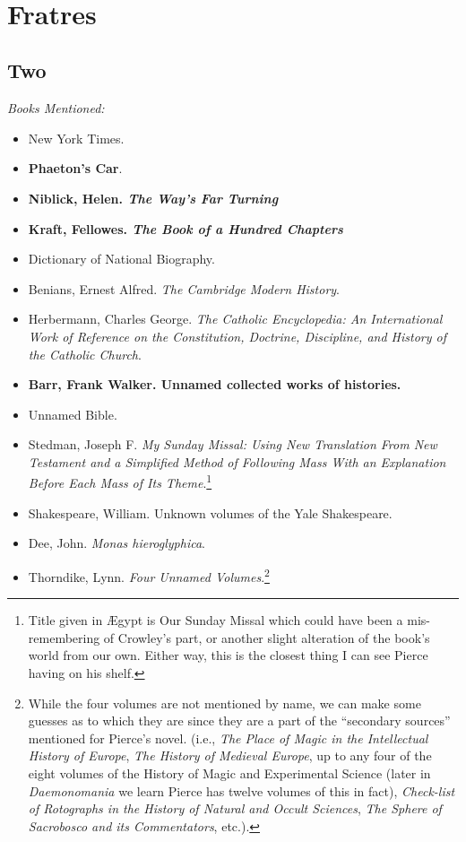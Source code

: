 \documentclass[12pt,makeidx]{extreport}
\newcommand\fleuron{\begin{turn}{45}\Large \ding{166}\end{turn}}
\newcommand\doublefleuron{%
	\reflectbox{\fleuron}\AC\staveXLIX\reflectbox{\AC}\fleuron}
\newcommand\fleuronbar{%
	{\huge\LinearACCCXIII}\xrfill[1.3ex]{1pt}\doublefleuron\xrfill[1.3ex]{1pt}\reflectbox{\huge\LinearACCCXIII}}
\newcommand\nbvspace[1][3]{\vspace*{\stretch{#1}}}
\begin{document}
\begin{center}
\vfill
\shadowoffset{1pt}
\\
\nbvspace[1]
\end{center}

\chapter{Fratres}
\section{Two}
\textit{Books Mentioned:}
\begin{itemize}
\item New York Times.
\item \textbf{Phaeton's Car}. \cite{phaeton}
\item \textbf{Niblick, Helen. \textit{The Way's Far Turning}} \cite{Niblick}
\item \textbf{Kraft, Fellowes. \textit{The Book of a Hundred Chapters}} \cite{Kraftf}
\item Dictionary of National Biography. \cite{1961}
\item Benians, Ernest Alfred. \textit{The Cambridge Modern History}. \cite{Benians1907}
\item Herbermann, Charles George. \textit{The Catholic Encyclopedia: An International Work of Reference on the Constitution, Doctrine, Discipline, and History of the Catholic Church}. \cite{Herbermann1908}
\item \textbf{Barr, Frank Walker. Unnamed collected works of histories.} \cite{Barrb}
\item Unnamed Bible.
\item Stedman, Joseph F. \textit{My Sunday Missal: Using New Translation From New Testament and a Simplified Method of Following Mass With an Explanation Before Each Mass of Its Theme}.\footnote{Title given in Ægypt is Our Sunday Missal which could have been a mis-remembering of Crowley's part, or another slight alteration of the book's world from our own. Either way, this is the closest thing I can see Pierce having on his shelf.} \cite{Stedman1956}
\item Shakespeare, William. Unknown volumes of the Yale Shakespeare.
\item Dee, John. \textit{Monas hieroglyphica}. \cite{Dee}
\item Thorndike, Lynn. \textit{Four Unnamed Volumes}.\footnote{While the four volumes are not mentioned by name, we can make some guesses as to which they are since they are a part of the ``secondary sources'' mentioned for Pierce's novel. (i.e., \textit{The Place of Magic in the Intellectual History of Europe}, \textit{The History of Medieval Europe}, up to any four of the eight volumes of the History of Magic and Experimental Science (later in \textit{Daemonomania} we learn Pierce has twelve volumes of this in fact), \textit{Check-list of Rotographs in the History of Natural and Occult Sciences}, \textit{The Sphere of Sacrobosco and its Commentators}, etc.).}

\end{itemize}
\end{document}
